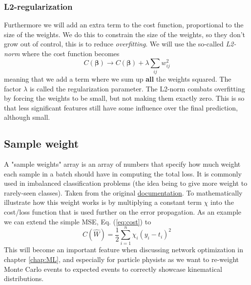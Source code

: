 \documentclass[14pt, a4paper]{book}
\begin{document}
\subsubsection*{L2-regularization}
Furthermore we will add an extra term to the cost function, proportional to the size of the weights. We do this to constrain the size of the weights, so they don't grow out of control, 
this is to reduce \textit{overfitting}. We will use the so-called \textit{L2-norm} where the cost function becomes
\begin{equation}\label{eq:L2-reg}
    C(\bm\beta)\rightarrow C(\bm\beta)+\lambda\sum_{ij}w_{ij}^2
\end{equation}
meaning that we add a term where we sum up \textbf{all} the weights squared. The factor $\lambda$ is called the regularization parameter. The L2-norm combats overfitting by forcing the weights to be small, but not making them exactly zero. 
This is so that less significant features still have some influence over the final prediction, although small.


\subsection{Sample weight}\label{sec:sample_weight}
A "sample weights" array is an array of numbers that specify how much weight each sample in a batch should have in computing the total loss. 
It is commonly used in imbalanced classification problems (the idea being to give more weight to rarely-seen classes). Taken from the original \href{https://www.tensorflow.org/guide/keras/train_and_evaluate#sample_weights}{documentation}. To mathematically illustrate how this 
weight works is by multiplying a constant term $\chi$ into the cost/loss function that is used further on the error propagation. As an example we can extend the simple MSE, Eq. (\ref{eq:cost}) to
\begin{equation}\label{eq:sample_weight}
    C(\hat{W})=\frac{1}{2}\sum_{i=1}^n\chi_i(y_i-t_i)^2
\end{equation}
This will become an important feature when discussing network optimization in chapter \ref{chap:ML}, and especially for particle physists as we want to re-weight Monte Carlo events to expected events to correctly showcase kinematical distributions.
\end{document}
